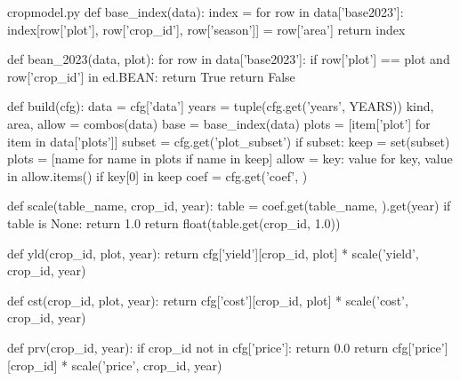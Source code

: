 \documentclass[bwprint]{gmcmthesis}
\begin{document}
\begin{appendices}
\begin{Python}{cropmodel.py}
def base_index(data):
    index = {}
    for row in data['base2023']:
        index[row['plot'], row['crop_id'], row['season']] = row['area']
    return index

def bean_2023(data, plot):
    for row in data['base2023']:
        if row['plot'] == plot and row['crop_id'] in ed.BEAN:
            return True
    return False

def build(cfg):
    data = cfg['data']
    years = tuple(cfg.get('years', YEARS))
    kind, area, allow = combos(data)
    base = base_index(data)
    plots = [item['plot'] for item in data['plots']]
    subset = cfg.get('plot_subset')
    if subset:
        keep = set(subset)
        plots = [name for name in plots if name in keep]
        allow = {key: value for key, value in allow.items() if key[0] in keep}
    coef = cfg.get('coef', {})

    def scale(table_name, crop_id, year):
        table = coef.get(table_name, {}).get(year)
        if table is None:
            return 1.0
        return float(table.get(crop_id, 1.0))

    def yld(crop_id, plot, year):
        return cfg['yield'][crop_id, plot] * scale('yield', crop_id, year)

    def cst(crop_id, plot, year):
        return cfg['cost'][crop_id, plot] * scale('cost', crop_id, year)

    def prv(crop_id, year):
        if crop_id not in cfg['price']:
            return 0.0
        return cfg['price'][crop_id] * scale('price', crop_id, year)


\end{Python}
\end{appendices}
\end{document}
